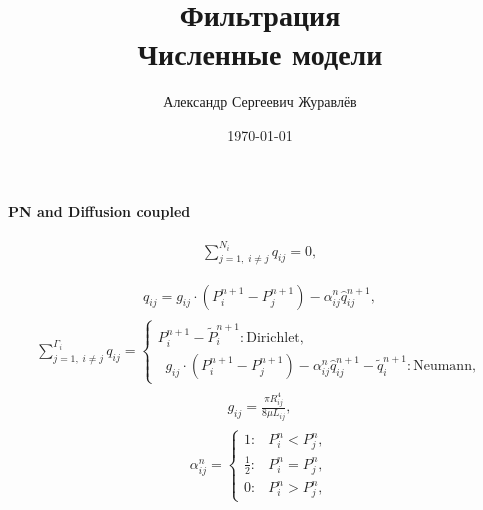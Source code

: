 \documentclass[a4paper,12pt,russian]{extreport}
\author{Александр Сергеевич Журавлёв}
\title{Фильтрация\\Численные модели}
\date{\today}
\begin{document}
    \pagecolor{pageColor}
    \color{fontColor}
    \Russian
    \printnomenclature[5em]


    \begin{center}
    {\large \textbf{PN and Diffusion coupled}}
    \end{center}

    \begin{eqnarray}
        \begin{gathered}
            \sum^{N_{i}}_{j=1, \; i\neq j} q_{ij} = 0,   \\
        \end{gathered}
    \end{eqnarray}
    \begin{eqnarray}
        \begin{gathered}
            q_{ij} = g_{ij} \cdot \left(P^{n+1}_{i} - P^{n+1}_{j}\right) - \alpha^n_{ij} \hat{q}^{n+1}_{ij} ,
        \end{gathered}
    \end{eqnarray}
    \begin{eqnarray}
        \sum^{\Gamma_{i}}_{j=1, \; i\neq j} q_{ij}=\begin{cases}
                                                       P^{n+1}_{i} - \tilde{P}^{n+1}_{i}: \text{Dirichlet},\\
                                                       \; \; g_{ij} \cdot \left(P^{n+1}_{i} - P^{n+1}_{j}\right) - \alpha^n_{ij} \hat{q}^{n+1}_{ij} - \tilde{q}^{n+1}_{i}: \text{Neumann},
        \end{cases}
    \end{eqnarray}
    \begin{eqnarray}
        \begin{gathered}
            g_{ij} = \frac{\pi R^4_{ij}}{8 \mu L_{ij}},
        \end{gathered}
    \end{eqnarray}
    \begin{eqnarray}
        \alpha^n_{ij} =\begin{cases}
                           1: & P^{n}_{i} < P^{n}_{j},\\
                           \frac{1}{2} : & P^{n}_{i} = P^{n}_{j},\\
                           0: & P^{n}_{i} > P^{n}_{j},
        \end{cases}
    \end{eqnarray}
\end{document}
